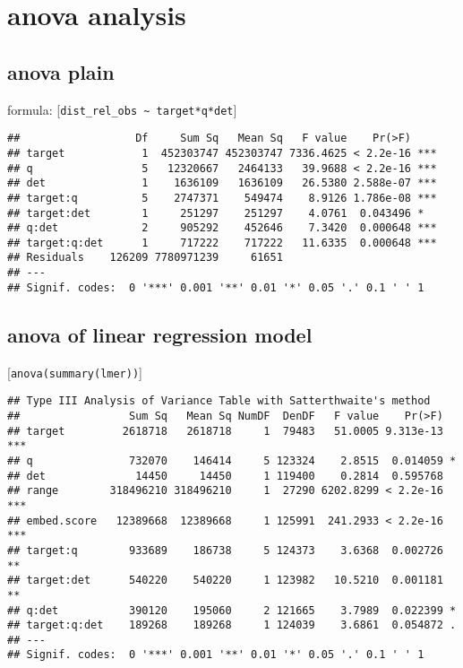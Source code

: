 \documentclass[
  12pt,
  oneside]{book}
\begin{document}
\section{anova analysis}\label{anova-analysis}

\subsection{anova plain}\label{anova-plain}

formula: {[}\texttt{dist\_rel\_obs\ \textasciitilde{}\ target*q*det}{]}

\begin{verbatim}
##                  Df     Sum Sq   Mean Sq   F value    Pr(>F)    
## target            1  452303747 452303747 7336.4625 < 2.2e-16 ***
## q                 5   12320667   2464133   39.9688 < 2.2e-16 ***
## det               1    1636109   1636109   26.5380 2.588e-07 ***
## target:q          5    2747371    549474    8.9126 1.786e-08 ***
## target:det        1     251297    251297    4.0761  0.043496 *  
## q:det             2     905292    452646    7.3420  0.000648 ***
## target:q:det      1     717222    717222   11.6335  0.000648 ***
## Residuals    126209 7780971239     61651                        
## ---
## Signif. codes:  0 '***' 0.001 '**' 0.01 '*' 0.05 '.' 0.1 ' ' 1
\end{verbatim}

\subsection{anova of linear regression model}\label{anova-of-linear-regression-model}

{[}\texttt{anova(summary(lmer))}{]}

\begin{verbatim}
## Type III Analysis of Variance Table with Satterthwaite's method
##                 Sum Sq   Mean Sq NumDF  DenDF   F value    Pr(>F)    
## target         2618718   2618718     1  79483   51.0005 9.313e-13 ***
## q               732070    146414     5 123324    2.8515  0.014059 *  
## det              14450     14450     1 119400    0.2814  0.595768    
## range        318496210 318496210     1  27290 6202.8299 < 2.2e-16 ***
## embed.score   12389668  12389668     1 125991  241.2933 < 2.2e-16 ***
## target:q        933689    186738     5 124373    3.6368  0.002726 ** 
## target:det      540220    540220     1 123982   10.5210  0.001181 ** 
## q:det           390120    195060     2 121665    3.7989  0.022399 *  
## target:q:det    189268    189268     1 124039    3.6861  0.054872 .  
## ---
## Signif. codes:  0 '***' 0.001 '**' 0.01 '*' 0.05 '.' 0.1 ' ' 1
\end{verbatim}
\end{document}
